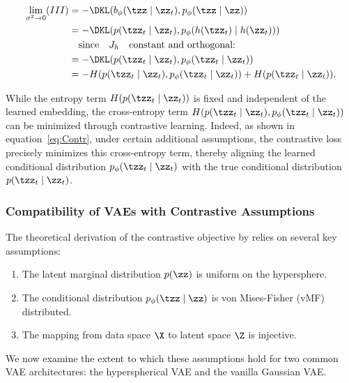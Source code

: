 \begin{align}
    \lim_{\sigma^2 \to 0} (III) & = -  \DKL(b_{\phi}(\tzz \mid \zz_t), p_{\phi}(\tzz \mid \zz))                       \\
                                & = - \DKL(p(\tzz_t \mid \zz_t), p_{\phi}(h(\tzz_t) \mid h(\zz_t)))                   \\
                                & \quad \text{since} \quad J_h \quad \text{constant and orthogonal:}                  \\
                                & = - \DKL(p(\tzz_t \mid \zz_t), p_{\phi}(\tzz_t \mid \zz_t))                         \\
                                & = - H(p(\tzz_t \mid \zz_t), p_{\phi}(\tzz_t \mid \zz_t)) + H(p(\tzz_t \mid \zz_t)).
\end{align}

While the entropy term $H(p(\tzz_t \mid \zz_t))$ is fixed and independent of the learned embedding, the cross-entropy term $H(p(\tzz_t \mid \zz_t), p_{\phi}(\tzz_t \mid \zz_t))$ can be minimized through contrastive learning. Indeed, as shown in equation~\eqref{eq:Contr}, under certain additional assumptions, the contrastive loss precisely minimizes this cross-entropy term, thereby aligning the learned conditional distribution $p_{\phi}(\tzz_t \mid \zz_t)$ with the true conditional distribution $p(\tzz_t \mid \zz_t)$.

\subsubsection{Compatibility of VAEs with Contrastive Assumptions}

The theoretical derivation of the contrastive objective by \citet{Zimmermann2021-ax} relies on several key assumptions:

\begin{enumerate}
    \item The latent marginal distribution $p(\zz)$ is uniform on the hypersphere.
    \item The conditional distribution $p_{\phi}(\tzz \mid \zz)$ is von Mises-Fisher (vMF) distributed.
    \item The mapping from data space $\X$ to latent space $\Z$ is injective.
\end{enumerate}

We now examine the extent to which these assumptions hold for two common VAE architectures: the hyperspherical VAE and the vanilla Gaussian VAE.

